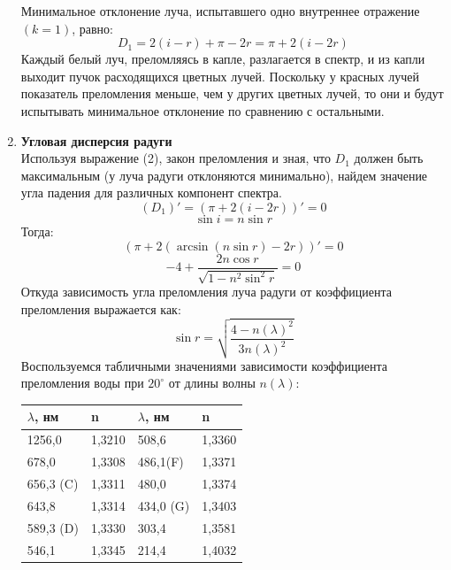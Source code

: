 \documentclass[a4paper]{article}
\begin{document}
\begin{multicols}{2}
\begin{enumerate}
Минимальное отклонение луча, испытавшего одно внутреннее отражение $(k = 1)$, равно:
\begin{equation}
D_1 = 2(i - r) + \pi  - 2r = \pi + 2(i - 2r)
\label{short}
\end{equation}
Каждый белый луч, преломляясь в капле, разлагается в спектр, и из капли
выходит пучок расходящихся цветных лучей. Поскольку у красных лучей показатель преломления меньше, чем у других цветных лучей, то они и будут испытывать минимальное отклонение по сравнению с остальными.\\
\item \textbf{Угловая дисперсия радуги}\\
Используя выражение (2), закон преломления и зная, что $D_1$ должен быть максимальным (у луча радуги отклоняются минимально), найдем значение угла падения для различных компонент спектра. 
\begin{equation}
(D_1)' = (\pi + 2(i - 2r))' = 0
\label{short}
\end{equation}
\begin{equation}
\sin i = n \sin r
\label{short}
\end{equation}
Тогда:
\begin{equation}
(\pi + 2(\arcsin(n\sin r) - 2r))' = 0 
\label{short}
\end{equation}
\begin{equation}
-4 + \frac{2n \cos r}{\sqrt{1 - n^2 \sin^2 r}} = 0
\label{short}
\end{equation}
Откуда зависимость угла преломления луча радуги от коэффициента преломления выражается как:
\begin{equation}
\sin r = \sqrt{\frac{4 - n(\lambda)^2}{3n(\lambda)^2}}
\label{short}
\end{equation}
Воспользуемся табличными значениями зависимости коэффициента преломления воды при $20^{\circ}$ от длины волны $n(\lambda)$:
\begin{center}
\begin{tabular}{|l|l|l|l|}
\hline
$\lambda$, нм & n & $\lambda$, нм & n\\
\hline
1256,0 & 1,3210 & 508,6 & 1,3360\\
\hline
678,0 & 1,3308 & 486,1(F) & 1,3371\\
\hline
656,3 (C) & 1,3311 & 480,0 & 1,3374\\
\hline
643,8 & 1,3314 & 434,0 (G) & 1,3403\\
\hline
589,3 (D) & 1,3330 & 303,4 & 1,3581\\
\hline
546,1 & 1,3345 & 214,4 & 1,4032\\

\end{tabular}
\end{center}
\end{enumerate}
\end{multicols}
\end{document}
